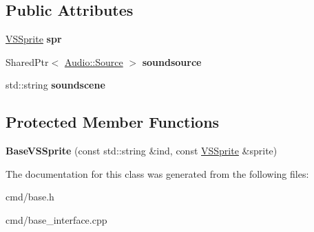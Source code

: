 \subsection*{Public Attributes}
\begin{DoxyCompactItemize}
\item 
\hyperlink{classVSSprite}{V\+S\+Sprite} {\bfseries spr}\hypertarget{classBaseInterface_1_1Room_1_1BaseVSSprite_ab86d69dc5d7042af74ca14b6cf32546e}{}\label{classBaseInterface_1_1Room_1_1BaseVSSprite_ab86d69dc5d7042af74ca14b6cf32546e}

\item 
Shared\+Ptr$<$ \hyperlink{classAudio_1_1Source}{Audio\+::\+Source} $>$ {\bfseries soundsource}\hypertarget{classBaseInterface_1_1Room_1_1BaseVSSprite_abf33dc6c207c192c1331a87054212d76}{}\label{classBaseInterface_1_1Room_1_1BaseVSSprite_abf33dc6c207c192c1331a87054212d76}

\item 
std\+::string {\bfseries soundscene}\hypertarget{classBaseInterface_1_1Room_1_1BaseVSSprite_a0cd180be14ef99390163cd5240dac259}{}\label{classBaseInterface_1_1Room_1_1BaseVSSprite_a0cd180be14ef99390163cd5240dac259}

\end{DoxyCompactItemize}
\subsection*{Protected Member Functions}
\begin{DoxyCompactItemize}
\item 
{\bfseries Base\+V\+S\+Sprite} (const std\+::string \&ind, const \hyperlink{classVSSprite}{V\+S\+Sprite} \&sprite)\hypertarget{classBaseInterface_1_1Room_1_1BaseVSSprite_a6ddd446243ef697c91cb1f35b1b61b63}{}\label{classBaseInterface_1_1Room_1_1BaseVSSprite_a6ddd446243ef697c91cb1f35b1b61b63}

\end{DoxyCompactItemize}


The documentation for this class was generated from the following files\+:\begin{DoxyCompactItemize}
\item 
cmd/base.\+h\item 
cmd/base\+\_\+interface.\+cpp\end{DoxyCompactItemize}
